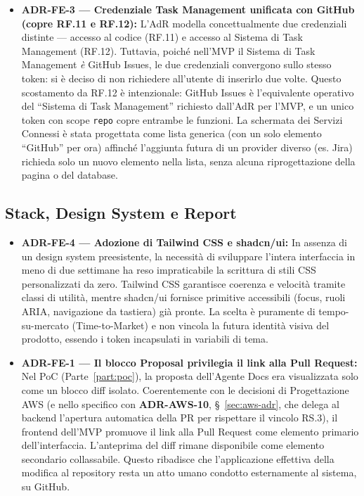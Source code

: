 \documentclass[11pt,a4paper]{article}
\begin{document}
\begin{itemize}
    \item \textbf{ADR-FE-3 --- Credenziale Task Management unificata con GitHub (copre RF.11 e RF.12):} L'AdR modella concettualmente due credenziali distinte --- accesso al codice (RF.11) e accesso al Sistema di Task Management (RF.12). Tuttavia, poiché nell'MVP il Sistema di Task Management \emph{è} GitHub Issues, le due credenziali convergono sullo stesso token: si è deciso di non richiedere all'utente di inserirlo due volte. Questo scostamento da RF.12 è intenzionale: GitHub Issues è l'equivalente operativo del ``Sistema di Task Management'' richiesto dall'AdR per l'MVP, e un unico token con scope \texttt{repo} copre entrambe le funzioni. La schermata dei Servizi Connessi è stata progettata come lista generica (con un solo elemento ``GitHub'' per ora) affinché l'aggiunta futura di un provider diverso (es. Jira) richieda solo un nuovo elemento nella lista, senza alcuna riprogettazione della pagina o del database.
\end{itemize}

\subsection{Stack, Design System e Report}

\begin{itemize}
    \item \textbf{ADR-FE-4 --- Adozione di Tailwind CSS e shadcn/ui:} In assenza di un design system preesistente, la necessità di sviluppare l'intera interfaccia in meno di due settimane ha reso impraticabile la scrittura di stili CSS personalizzati da zero. Tailwind CSS garantisce coerenza e velocità tramite classi di utilità, mentre shadcn/ui fornisce primitive accessibili (focus, ruoli ARIA, navigazione da tastiera) già pronte. La scelta è puramente di tempo-su-mercato (Time-to-Market) e non vincola la futura identità visiva del prodotto, essendo i token incapsulati in variabili di tema.
    \item \textbf{ADR-FE-1 --- Il blocco Proposal privilegia il link alla Pull Request:} Nel PoC (Parte~\ref{part:poc}), la proposta dell'Agente Docs era visualizzata solo come un blocco diff isolato. Coerentemente con le decisioni di Progettazione AWS (e nello specifico con \textbf{ADR-AWS-10}, \S~\ref{sec:aws-adr}, che delega al backend l'apertura automatica della PR per rispettare il vincolo RS.3), il frontend dell'MVP promuove il link alla Pull Request come elemento primario dell'interfaccia. L'anteprima del diff rimane disponibile come elemento secondario collassabile. Questo ribadisce che l'applicazione effettiva della modifica al repository resta un atto umano condotto esternamente al sistema, su GitHub.
\end{itemize}
\end{document}
